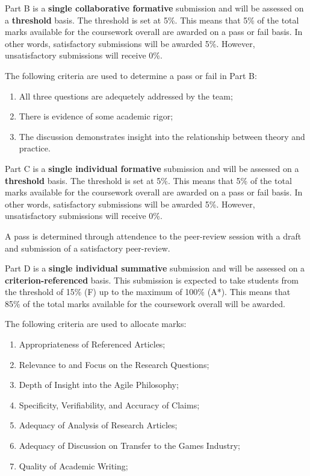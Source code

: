 \documentclass{../fal_assignment}
\begin{document}
Part B is a \textbf{single collaborative formative} submission and will be assessed on a \textbf{threshold} basis. The threshold is set at 5\%. This means that 5\% of the total marks available for the coursework overall are awarded on a pass or fail basis. In other words, satisfactory submissions will be awarded 5\%. However, unsatisfactory submissions will receive 0\%.

The following criteria are used to determine a pass or fail in Part B:

\begin{enumerate}[label=(\alph*)]
	\item All three questions are adequetely addressed by the team;
	\item There is evidence of some academic rigor;
	\item The discussion demonstrates insight into the relationship between theory and practice.
\end{enumerate}

Part C is a \textbf{single individual formative} submission and will be assessed on a \textbf{threshold} basis. The threshold is set at 5\%. This means that 5\% of the total marks available for the coursework overall are awarded on a pass or fail basis. In other words, satisfactory submissions will be awarded 5\%. However, unsatisfactory submissions will receive 0\%.

A pass is determined through attendence to the peer-review session with a draft and submission of a satisfactory peer-review.

Part D is a \textbf{single individual summative} submission and will be assessed on a \textbf{criterion-referenced} basis. This submission is expected to take students from the threshold of 15\% (F) up to the maximum of 100\% (A*). This means that 85\% of the total marks available for the coursework overall will be awarded.

The following criteria are used to allocate marks:

\begin{enumerate}[label=(\alph*)]
	\item Appropriateness of Referenced Articles;
	\item Relevance to and Focus on the Research Questions;
	\item Depth of Insight into the Agile Philosophy;
	\item Specificity, Verifiability, and Accuracy of Claims;
	\item Adequacy of Analysis of Research Articles;	
	\item Adequacy of Discussion on Transfer to the Games Industry;
	\item Quality of Academic Writing;
\end{enumerate}
\end{document}
